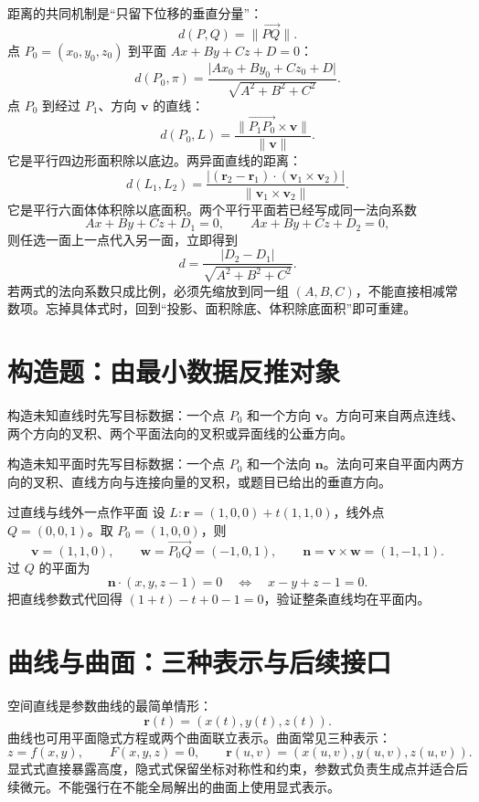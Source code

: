 \documentclass[11pt,a4paper]{ctexart}
\begin{document}
距离的共同机制是“只留下位移的垂直分量”：
\[
d(P,Q)=\lVert\overrightarrow{PQ}\rVert.
\]
点 $P_0=(x_0,y_0,z_0)$ 到平面 $Ax+By+Cz+D=0$：
\[
d(P_0,\pi)=\frac{\lvert Ax_0+By_0+Cz_0+D\rvert}{\sqrt{A^2+B^2+C^2}}.
\]
点 $P_0$ 到经过 $P_1$、方向 $\mathbf v$ 的直线：
\[
d(P_0,L)=\frac{\lVert\overrightarrow{P_1P_0}\times\mathbf v\rVert}{\lVert\mathbf v\rVert}.
\]
它是平行四边形面积除以底边。两异面直线的距离：
\[
d(L_1,L_2)=
\frac{\lvert(\mathbf r_2-\mathbf r_1)\cdot(\mathbf v_1\times\mathbf v_2)\rvert}{\lVert\mathbf v_1\times\mathbf v_2\rVert}.
\]
它是平行六面体体积除以底面积。两个平行平面若已经写成同一法向系数
\[
Ax+By+Cz+D_1=0,\qquad Ax+By+Cz+D_2=0,
\]
则任选一面上一点代入另一面，立即得到
\[
\boxed{d=\frac{\lvert D_2-D_1\rvert}{\sqrt{A^2+B^2+C^2}}}.
\]
若两式的法向系数只成比例，必须先缩放到同一组 $(A,B,C)$，不能直接相减常数项。忘掉具体式时，回到“投影、面积除底、体积除底面积”即可重建。

\section{构造题：由最小数据反推对象}

构造未知直线时先写目标数据：一个点 $P_0$ 和一个方向 $\mathbf v$。方向可来自两点连线、两个方向的叉积、两个平面法向的叉积或异面线的公垂方向。

构造未知平面时先写目标数据：一个点 $P_0$ 和一个法向 $\mathbf n$。法向可来自平面内两方向的叉积、直线方向与连接向量的叉积，或题目已给出的垂直方向。

\begin{examplebox}{过直线与线外一点作平面}
设 $L:\mathbf r=(1,0,0)+t(1,1,0)$，线外点 $Q=(0,0,1)$。取 $P_0=(1,0,0)$，则
\[
\mathbf v=(1,1,0),\qquad \mathbf w=\overrightarrow{P_0Q}=(-1,0,1),
\qquad \mathbf n=\mathbf v\times\mathbf w=(1,-1,1).
\]
过 $Q$ 的平面为
\[
\mathbf n\cdot(x,y,z-1)=0
\quad\Longleftrightarrow\quad
\boxed{x-y+z-1=0}.
\]
把直线参数式代回得 $(1+t)-t+0-1=0$，验证整条直线均在平面内。
\end{examplebox}

\section{曲线与曲面：三种表示与后续接口}

空间直线是参数曲线的最简单情形：
\[
\mathbf r(t)=(x(t),y(t),z(t)).
\]
曲线也可用平面隐式方程或两个曲面联立表示。曲面常见三种表示：
\[
z=f(x,y),\qquad F(x,y,z)=0,\qquad
\mathbf r(u,v)=(x(u,v),y(u,v),z(u,v)).
\]
显式式直接暴露高度，隐式式保留坐标对称性和约束，参数式负责生成点并适合后续微元。不能强行在不能全局解出的曲面上使用显式表示。
\end{document}
